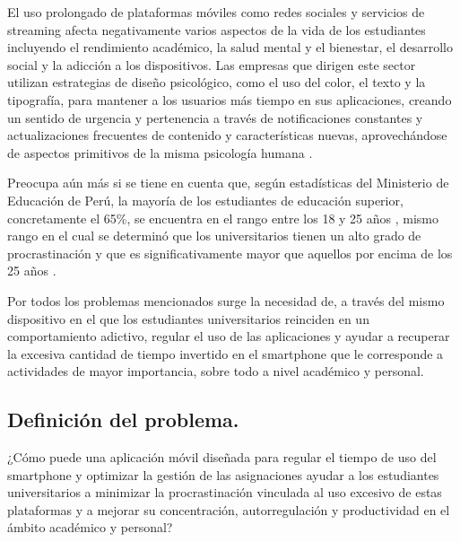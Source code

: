 El uso prolongado de plataformas móviles como redes sociales y servicios de streaming afecta negativamente varios aspectos de la vida de los estudiantes incluyendo el rendimiento académico, la salud mental y el bienestar, el desarrollo social y la adicción a los dispositivos. Las empresas que dirigen este sector utilizan estrategias de diseño psicológico, como el uso del color, el texto y la tipografía, para mantener a los usuarios más tiempo en sus aplicaciones, creando un sentido de urgencia y pertenencia a través de notificaciones constantes y actualizaciones frecuentes de contenido y características nuevas, aprovechándose de aspectos primitivos de la misma psicología humana \cite{Neyman2017}.

Preocupa aún más si se tiene en cuenta que, según estadísticas del Ministerio de Educación de Perú, la mayoría de los estudiantes de educación superior, concretamente el 65\%, se encuentra en el rango entre los 18 y 25 años \cite{UniversidadCifras2023}, mismo rango en el cual se determinó que los universitarios tienen un alto grado de procrastinación y que es significativamente mayor que aquellos por encima de los 25 años \cite{Rodriguez2017}.

Por todos los problemas mencionados surge la necesidad de, a través del mismo dispositivo en el que los estudiantes universitarios reinciden en un comportamiento adictivo, regular el uso de las aplicaciones y ayudar a recuperar la excesiva cantidad de tiempo invertido en el smartphone que le corresponde a actividades de mayor importancia, sobre todo a nivel académico y personal.


\subsection{Definici\'on del problema.}

¿Cómo puede una aplicación móvil diseñada para regular el tiempo de uso del smartphone y optimizar la gestión de las asignaciones ayudar a los estudiantes universitarios a minimizar la procrastinación vinculada al uso excesivo de estas plataformas y a mejorar su concentración, autorregulación y productividad en el ámbito académico y personal?